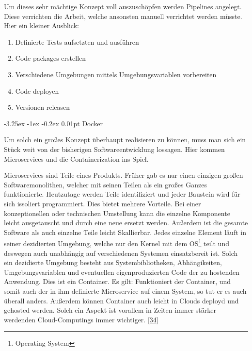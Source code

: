 \documentclass[
    headings=optiontotocandhead,%
    twoside,
    numbers=noenddot,%
    12pt, %
    titlepage, %
    parskip=full, %
    listof=leveldown, 
    numbers=noenddot, %
    a4paper,DIV=14,
    BCOR=15mm,
]{scrbook}
\makeatletter
\providecommand{\tightlist}{%
  \setlength{\itemsep}{0pt}\setlength{\parskip}{0pt}}
\renewcommand\paragraph{\@startsection{paragraph}{4}{\z@}%
    {-3.25ex \@plus -1ex \@minus -0.2ex}%
    {0.01pt}%
    {\raggedsection\normalfont\sectfont\nobreak\size@paragraph}%
  }
\makeatother
\begin{document}
Um dieses sehr mächtige Konzept voll auszuschöpfen werden Pipelines
angelegt. Diese verrichten die Arbeit, welche ansonsten manuell
verrichtet werden müsste. Hier ein kleiner Ausblick:

\begin{enumerate}
\def\labelenumi{\arabic{enumi}.}
\tightlist
\item
  Definierte Tests aufsetzten und ausführen
\item
  Code packages erstellen
\item
  Verschiedene Umgebungen mittels Umgebungsvariablen vorbereiten
\item
  Code deployen
\item
  Versionen releasen
\end{enumerate}

\hypertarget{docker}{%
\paragraph{Docker}\label{docker}}

Um solch ein großes Konzept überhaupt realisieren zu können, muss man
sich ein Stück weit von der bisherigen Softwareentwicklung lossagen.
Hier kommen Microservices und die Containerization ins Spiel.

Microservices sind Teile eines Produkts. Früher gab es nur einen
einzigen großen Softwaremonolithen, welcher mit seinen Teilen als ein
großes Ganzes funktionierte. Heutzutage werden Teile identifiziert und
jeder Baustein wird für sich issoliert programmiert. Dies bietet mehrere
Vorteile. Bei einer konzeptionellen oder technischen Umstellung kann die
einzelne Komponente leicht ausgetauscht und durch eine neue ersetzt
werden. Außerdem ist die gesamte Software als auch einzelne Teile leicht
Skallierbar. Jedes einzelne Element läuft in seiner dezidierten
Umgebung, welche nur den Kernel mit dem OS\footnote{Operating System}
teilt und deswegen auch unabhängig auf verschiedenen Systemen
einsatzbereit ist. Solch ein dezidierte Umgebung besteht aus
Systembibliotheken, Abhängikeiten, Umgebungsvariablen und eventuellen
eigenproduzierten Code der zu hostenden Anwendung. Dies ist ein
Container. Es gilt: Funktioniert der Container, und somit auch der in
ihm definierte Microservice auf einem System, so tut er es auch überall
anders. Außerdem können Container auch leicht in Clouds deployd und
gehosted werden. Solch ein Aspekt ist vorallem in Zeiten immer stärker
werdenden Cloud-Computings immer wichtiger.
{[}\protect\hyperlink{ref-ibm-docker}{34}{]}
\end{document}

